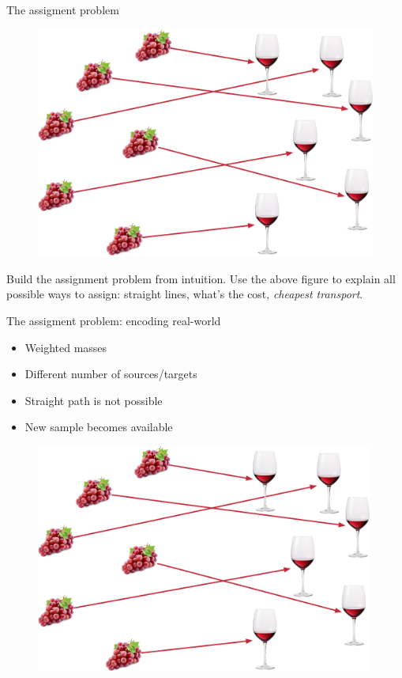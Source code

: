 \documentclass[pdf,aspectratio=169,10pt]{beamer}
\begin{document}
\begin{frame}{The assigment problem}
    \begin{figure}
        \includegraphics[height=0.7\textheight]{../img/wine_assignment.pdf}  
    \end{figure}
    Build the assignment problem from intuition. Use the above figure to explain all possible ways to assign: straight lines, what's the cost, \emph{cheapest transport}. 
\end{frame}

\begin{frame}{The assigment problem: encoding real-world}

\begin{minipage}{0.45\textwidth}
\begin{itemize}
    \item Weighted masses
    \item Different number of sources/targets
    \item Straight path is not possible
    \item New sample becomes available
\end{itemize}
\end{minipage}
\hfill
\begin{minipage}{0.5\textwidth}
 \begin{figure}
        \includegraphics[width=0.99\textwidth]{../img/wine_assignment.pdf}  
    \end{figure}
\end{minipage}

\end{frame}
\end{document}
